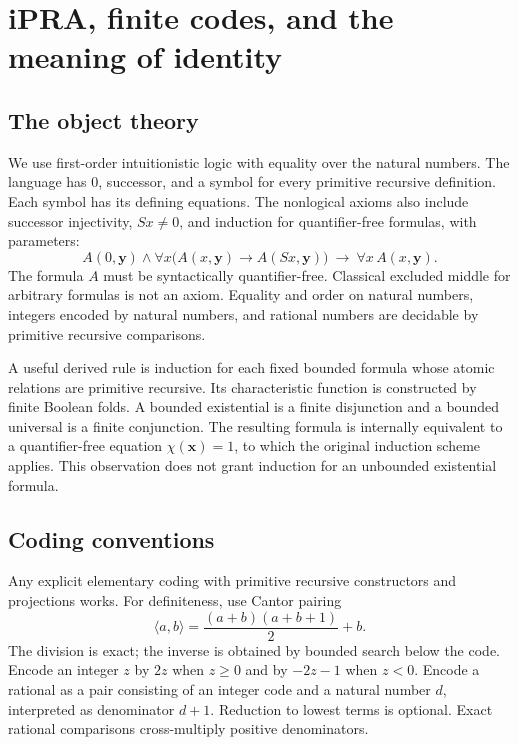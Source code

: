 \section{iPRA, finite codes, and the meaning of identity}
\label{sec:arithmetic}

\subsection{The object theory}

We use first-order intuitionistic logic with equality over the natural
numbers. The language has $0$, successor, and a symbol for every primitive
recursive definition. Each symbol has its defining equations. The
nonlogical axioms also include successor injectivity, $Sx\ne0$, and
induction for quantifier-free formulas, with parameters:
\[
 A(0,\boldsymbol y)\land
 \forall x\bigl(A(x,\boldsymbol y)\to A(Sx,\boldsymbol y)\bigr)
 \ \longrightarrow\ \forall x\,A(x,\boldsymbol y).
\]
The formula $A$ must be syntactically quantifier-free. Classical excluded
middle for arbitrary formulas is not an axiom. Equality and order on
natural numbers, integers encoded by natural numbers, and rational numbers
are decidable by primitive recursive comparisons.

A useful derived rule is induction for each fixed bounded formula whose
atomic relations are primitive recursive. Its characteristic function is
constructed by finite Boolean folds. A bounded existential is a finite
disjunction and a bounded universal is a finite conjunction. The resulting
formula is internally equivalent to a quantifier-free equation
$\chi(\boldsymbol x)=1$, to which the original induction scheme applies.
This observation does not grant induction for an unbounded existential
formula.

\subsection{Coding conventions}

Any explicit elementary coding with primitive recursive constructors and
projections works. For definiteness, use Cantor pairing
\[
 \langle a,b\rangle=\frac{(a+b)(a+b+1)}2+b.
\]
The division is exact; the inverse is obtained by bounded search below the
code. Encode an integer $z$ by $2z$ when $z\ge0$ and by $-2z-1$ when
$z<0$. Encode a rational as a pair consisting of an integer code and a
natural number $d$, interpreted as denominator $d+1$. Reduction to lowest
terms is optional. Exact rational comparisons cross-multiply positive
denominators.

